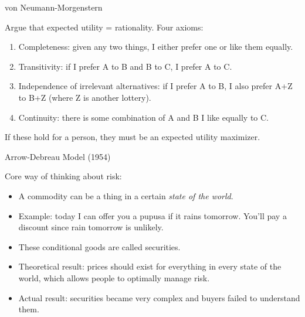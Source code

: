 \documentclass[ignorenonframetext,]{beamer}
\providecommand{\tightlist}{%
  \setlength{\itemsep}{0pt}\setlength{\parskip}{0pt}}
\begin{document}
\begin{frame}{von Neumann-Morgenstern}
\protect\hypertarget{von-neumann-morgenstern}{}

Argue that expected utility = rationality. Four axioms:

\begin{enumerate}
\tightlist
\item
  Completeness: given any two things, I either prefer one or like them
  equally.
\item
  Transitivity: if I prefer A to B and B to C, I prefer A to C.
\item
  Independence of irrelevant alternatives: if I prefer A to B, I also
  prefer A+Z to B+Z (where Z is another lottery).
\item
  Continuity: there is some combination of A and B I like equally to C.
\end{enumerate}

If these hold for a person, they must be an expected utility maximizer.

\end{frame}

\begin{frame}{Arrow-Debreau Model (1954)}
\protect\hypertarget{arrow-debreau-model-1954}{}

Core way of thinking about risk:

\begin{itemize}
\tightlist
\item
  A commodity can be a thing in a certain \emph{state of the world}.
\item
  Example: today I can offer you a pupusa if it rains tomorrow. You'll
  pay a discount since rain tomorrow is unlikely.
\item
  These conditional goods are called securities.
\item
  Theoretical result: prices should exist for everything in every state
  of the world, which allows people to optimally manage risk.
\item
  Actual result: securities became very complex and buyers failed to
  understand them.
\end{itemize}

\end{frame}
\end{document}
